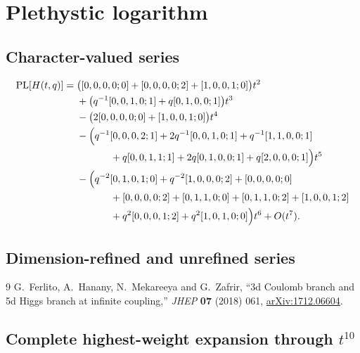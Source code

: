 \documentclass[11pt]{article}
\begin{document}
\section{Plethystic logarithm}
\subsection{Character-valued series}
\begin{align*}
\operatorname{PL}[H(t,q)]={}&
\bigl([0,0,0,0;0]+[0,0,0,0;2]+[1,0,0,1;0]\bigr)t^2\\
&+\bigl(q^{-1}[0,0,1,0;1]+q[0,1,0,0;1]\bigr)t^3\\
&-\bigl(2[0,0,0,0;0]+[1,0,0,1;0]\bigr)t^4\\
&-\Bigl(q^{-1}[0,0,0,2;1]+2q^{-1}[0,0,1,0;1]
+q^{-1}[1,1,0,0;1]\\
&\hspace{1.2cm}+q[0,0,1,1;1]+2q[0,1,0,0;1]
+q[2,0,0,0;1]\Bigr)t^5\\
&-\Bigl(q^{-2}[0,1,0,1;0]+q^{-2}[1,0,0,0;2]
+[0,0,0,0;0]\\
&\hspace{1.2cm}+[0,0,0,0;2]+[0,1,1,0;0]+[0,1,1,0;2]
+[1,0,0,1;2]\\
&\hspace{1.2cm}+q^2[0,0,0,1;2]+q^2[1,0,1,0;0]\Bigr)t^6
+O(t^7).
\end{align*}

\subsection{Dimension-refined and unrefined series}



\begin{thebibliography}{9}
G.~Ferlito, A.~Hanany, N.~Mekareeya and G.~Zafrir,
``3d Coulomb branch and 5d Higgs branch at infinite coupling,''
\emph{JHEP} \textbf{07} (2018) 061,
\href{https://arxiv.org/abs/1712.06604}{arXiv:1712.06604}.
\end{thebibliography}

\BeginQFFFAppendices

\clearpage
\begin{landscape}
\section{Complete highest-weight expansion through $t^{10}$}
{\small}
\end{landscape}
\end{document}
